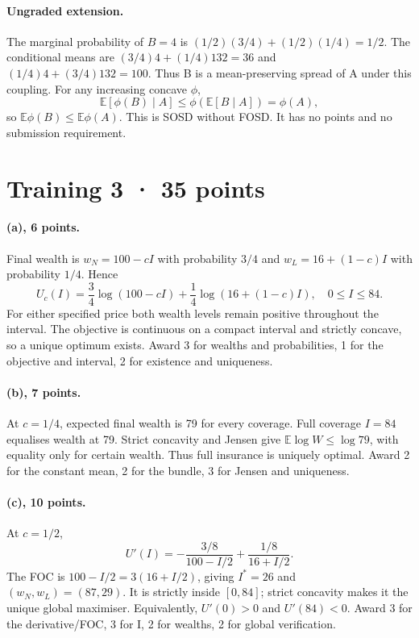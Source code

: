 \paragraph{Ungraded extension.}
The marginal probability of $B=4$ is
$(1/2)(3/4)+(1/2)(1/4)=1/2$. The conditional means are
$(3/4)4+(1/4)132=36$ and $(1/4)4+(3/4)132=100$.
Thus B is a mean-preserving spread of A under this coupling. For any
increasing concave $\phi$,
\[
 \mathbb E[\phi(B)\mid A]\le\phi(\mathbb E[B\mid A])=\phi(A),
\]
so $\mathbb E\phi(B)\le\mathbb E\phi(A)$. This is SOSD without FOSD.
It has no points and no submission requirement.

\clearpage
\section*{Training 3 · 35 points}
\paragraph{(a), 6 points.}
Final wealth is $w_N=100-cI$ with probability $3/4$ and
$w_L=16+(1-c)I$ with probability $1/4$. Hence
\[
 U_c(I)=\frac34\log(100-cI)+\frac14\log(16+(1-c)I),\quad0\le I\le84.
\]
For either specified price both wealth levels remain positive throughout
the interval. The objective is continuous on a compact interval and strictly
concave, so a unique optimum exists. Award 3 for wealths and probabilities,
1 for the objective and interval, 2 for existence and uniqueness.

\paragraph{(b), 7 points.}
At $c=1/4$, expected final wealth is 79 for every coverage. Full coverage
$I=84$ equalises wealth at 79. Strict concavity and Jensen give
$\mathbb E\log W\le\log79$, with equality only for certain wealth.
Thus full insurance is uniquely optimal. Award 2 for the constant mean,
2 for the bundle, 3 for Jensen and uniqueness.

\paragraph{(c), 10 points.}
At $c=1/2$,
\[
 U'(I)=-\frac{3/8}{100-I/2}+\frac{1/8}{16+I/2}.
\]
The FOC is $100-I/2=3(16+I/2)$, giving $I^*=26$ and
$(w_N,w_L)=(87,29)$. It is strictly inside $[0,84]$; strict concavity makes
it the unique global maximiser. Equivalently, $U'(0)>0$ and $U'(84)<0$.
Award 3 for the derivative/FOC, 3 for I, 2 for wealths, 2 for global verification.

